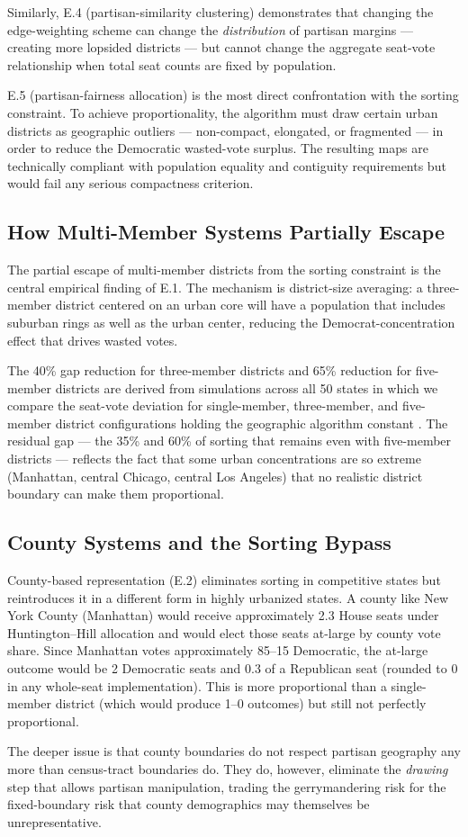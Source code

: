 Similarly, E.4 (partisan-similarity clustering) demonstrates that changing the
edge-weighting scheme can change the \emph{distribution} of partisan margins
--- creating more lopsided districts --- but cannot change the aggregate
seat-vote relationship when total seat counts are fixed by population.

E.5 (partisan-fairness allocation) is the most direct confrontation with the
sorting constraint.  To achieve proportionality, the algorithm must draw
certain urban districts as geographic outliers --- non-compact, elongated, or
fragmented --- in order to reduce the Democratic wasted-vote surplus.  The
resulting maps are technically compliant with population equality and
contiguity requirements but would fail any serious compactness criterion.

\subsection{How Multi-Member Systems Partially Escape}

The partial escape of multi-member districts from the sorting constraint is
the central empirical finding of E.1.  The mechanism is district-size
averaging: a three-member district centered on an urban core will have a
population that includes suburban rings as well as the urban center, reducing
the Democrat-concentration effect that drives wasted votes.

The 40\% gap reduction for three-member districts and 65\% reduction for
five-member districts are derived from simulations across all 50 states in
which we compare the seat-vote deviation for single-member, three-member, and
five-member district configurations holding the geographic algorithm constant
\citep{dellaLibera2026e1}.  The residual gap --- the 35\% and 60\% of sorting
that remains even with five-member districts --- reflects the fact that some
urban concentrations are so extreme (Manhattan, central Chicago, central Los
Angeles) that no realistic district boundary can make them proportional.

\subsection{County Systems and the Sorting Bypass}

County-based representation (E.2) eliminates sorting in competitive states but
reintroduces it in a different form in highly urbanized states.  A county like
New York County (Manhattan) would receive approximately 2.3 House seats under
Huntington--Hill allocation and would elect those seats at-large by county vote
share.  Since Manhattan votes approximately 85--15 Democratic, the at-large
outcome would be 2 Democratic seats and 0.3 of a Republican seat (rounded to 0
in any whole-seat implementation).  This is more proportional than a single-
member district (which would produce 1--0 outcomes) but still not perfectly
proportional.

The deeper issue is that county boundaries do not respect partisan geography
any more than census-tract boundaries do.  They do, however, eliminate the
\emph{drawing} step that allows partisan manipulation, trading the gerrymandering
risk for the fixed-boundary risk that county demographics may themselves be
unrepresentative.
